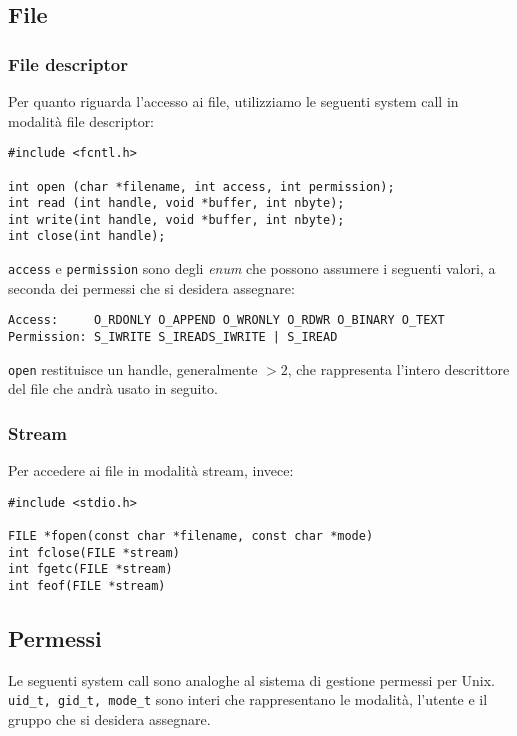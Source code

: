\documentclass[11pt]{article}
\begin{document}
\subsection{File}

\subsubsection{File descriptor}

Per quanto riguarda l'accesso ai file, utilizziamo le seguenti system call in modalità file descriptor:

\begin{verbatim}
#include <fcntl.h>

int open (char *filename, int access, int permission);
int read (int handle, void *buffer, int nbyte);
int write(int handle, void *buffer, int nbyte);
int close(int handle);
\end{verbatim}

\verb|access| e \verb|permission| sono degli \textit{enum} che possono assumere i seguenti valori, a seconda dei permessi che si desidera assegnare:

\begin{verbatim}
Access:     O_RDONLY O_APPEND O_WRONLY O_RDWR O_BINARY O_TEXT
Permission: S_IWRITE S_IREADS_IWRITE | S_IREAD
\end{verbatim}

\verb|open| restituisce un handle, generalmente $> 2$, che rappresenta l'intero descrittore del file che andrà usato in seguito.

\subsubsection{Stream}

Per accedere ai file in modalità stream, invece:

\begin{verbatim}
#include <stdio.h>

FILE *fopen(const char *filename, const char *mode)
int fclose(FILE *stream)
int fgetc(FILE *stream)
int feof(FILE *stream)
\end{verbatim}

\subsection{Permessi}
Le seguenti system call sono analoghe al sistema di gestione permessi per Unix. \verb|uid_t, gid_t, mode_t| sono interi che rappresentano le modalità, l'utente e il gruppo che si desidera assegnare.
\end{document}
